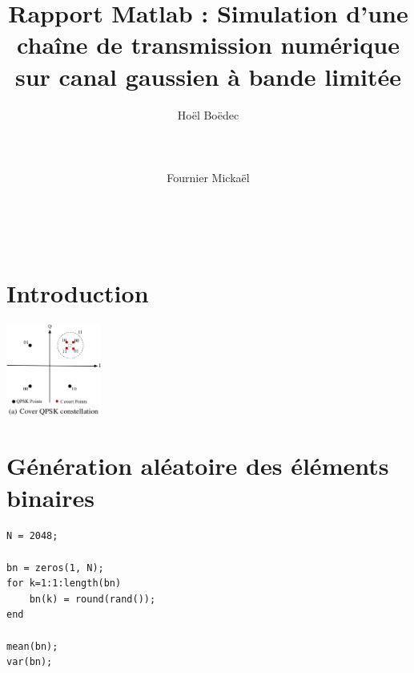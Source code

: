 \documentclass{acm_proc_article-sp}
\begin{document}
\title{Rapport Matlab : Simulation d'une chaîne de transmission numérique sur canal gaussien à bande limitée}

\author{
\alignauthor
Hoël Boëdec\\
       \\
       \\
       \\
\alignauthor
Fournier Mickaël\\
       \\
       \\
       \\
}

\maketitle
\begin{abstract}
    
\end{abstract}


\section{Introduction}

\begin{center}
\includegraphics[height=3cm]{DirtyConstellation.eps}
\end{center}


\section{Génération aléatoire des éléments binaires}
\begin{lstlisting}
N = 2048;

bn = zeros(1, N);
for k=1:1:length(bn)
    bn(k) = round(rand());
end

mean(bn);
var(bn);
\end{lstlisting}
\end{document}
